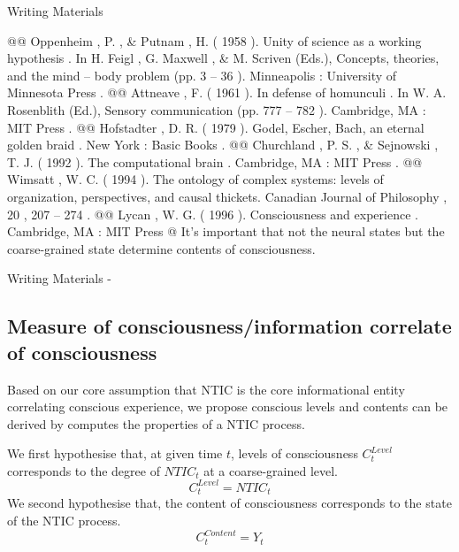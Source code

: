 \documentclass[utf8]{article}
\newenvironment{WritingMaterials} %
    	{
            \begin{tcolorbox}[enhanced,
                title=-,
                size=small,
                colbacktitle=Aquamarine,
                drop fuzzy shadow,
                fontupper=\small,
                boxrule=0.4pt,
                colback=Aquamarine!10!white,
                sharp corners]
                Writing Materials
            \end{tcolorbox}
            \begin{easylist}[itemize]
    	}
    	{
            \end{easylist}  
            \begin{tcolorbox}[enhanced,
                halign=flush right,
                halign title=right,
                size=small,
                colbacktitle=Aquamarine,
                drop fuzzy shadow,
                fontupper=\small,
                boxrule=0.4pt,
                colback=Aquamarine,
                colupper=White,
                sharp corners]
                Writing Materials -
            \end{tcolorbox}        
    	}
\newcommand{\rlstart}[1]{  %
        \setlength\changebarwidth{#1pt*2}  %
        \hspace*{-40pt}
        \cbstart{\textcolor{red}{\newline\textbf{iteration #1}}\newline}}
\newcommand{\rlend}{\cbend}
\begin{document}
\begin{WritingMaterials}
				@@ Oppenheim , P. , \& Putnam , H. ( 1958 ). Unity of science as a working hypothesis . In H. Feigl , G. Maxwell , \& M. Scriven (Eds.), Concepts, theories, and the mind – body problem (pp. 3 – 36 ). Minneapolis : University of Minnesota Press .
				@@ Attneave , F. ( 1961 ). In defense of homunculi . In W. A. Rosenblith (Ed.), Sensory communication (pp. 777 – 782 ). Cambridge, MA : MIT Press .
				@@ Hofstadter , D. R. ( 1979 ). Godel, Escher, Bach, an eternal golden braid . New York : Basic Books .
				@@ Churchland , P. S. , \& Sejnowski , T. J. ( 1992 ). The computational brain . Cambridge, MA : MIT Press .
				@@ Wimsatt , W. C. ( 1994 ). The ontology of complex systems: levels of organization, perspectives, and causal thickets. Canadian Journal of Philosophy , 20 , 207 – 274 .
				@@ Lycan ,  W. G.  ( 1996 ).  Consciousness and experience .  Cambridge, MA :  MIT Press
			@ It's important that not the neural states but the coarse-grained state determine contents of consciousness.

        

		\end{WritingMaterials}


\rlend







\rlstart{3}
		\subsection{Measure of consciousness/information correlate of consciousness}	
		Based on our core assumption that NTIC is the core informational entity correlating conscious experience, we propose conscious levels and contents can be derived by computes the properties of a NTIC process. \newline
		
		\noindent
		We first hypothesise that, at given time $t$, levels of consciousness $C_{t}^{Level}$ corresponds to the degree of  $NTIC_{t}$ at a coarse-grained level.
			\begin{equation}\label{eq:cLevel}
				C_{t}^{Level} = NTIC_{t}
			\end{equation}
		\newline
		\noindent 
		We second hypothesise that, the content of consciousness corresponds to the state of the NTIC process.
			\begin{equation}\label{eq:cContent}
				C_{t}^{Content} = Y_{t}
			\end{equation}
		
\end{document}
